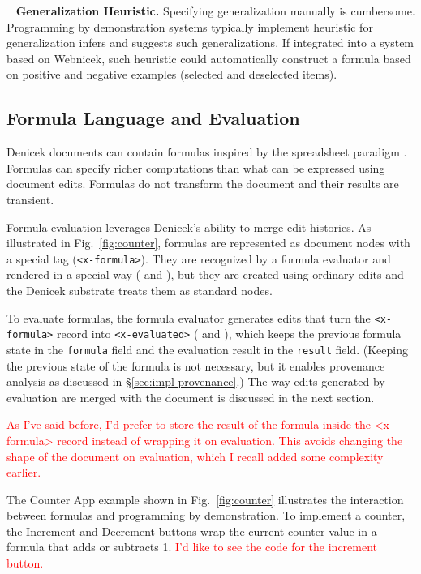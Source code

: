 \documentclass[sigconf,anonymous,screen]{acmart}
\newcommand{\note}[1]{\textcolor{red}{#1}}
\newcommand*\circled[1]{\textnormal{\footnotesize\sffamily\bfseries\protect\tikz[baseline=(char.base)]{
  \node[shape=circle,fill=black,text=white,draw,inner sep=1pt] (char) {#1};}}}
\DeclareRobustCommand{\keyideabox}[3]{\begin{tcolorbox}[breakable,
  boxsep=5pt,left=0pt,right=0pt,top=0pt,bottom=0pt,width=\dimexpr\columnwidth\relax,
  colback=gray!20,colframe=gray!20,
  enlarge bottom by=0pt,enlarge top by=0pt,
  arc=0pt,outer arc=0pt]
\lettrine[lraise=0.3]{\LARGE #1}{~}
\small \textbf{#2.} #3
\end{tcolorbox}
}
\begin{document}
\keyideabox{\faMagic}{Generalization Heuristic}{Specifying generalization manually is cumbersome.
Programming by demonstration systems typically implement heuristic for generalization
\cite{myers-2000-intelligence} infers and suggests such generalizations. If integrated into
a system based on Webnicek, such heuristic could automatically construct a formula
based on positive and negative examples \cite{gulwani-2014-flash} (selected and deselected items).}


\subsection{Formula Language and Evaluation}
\label{sec:impl-eval}

Denicek documents can contain formulas inspired by the spreadsheet
paradigm \cite{nardi-1990-spreadsheets}. Formulas can specify richer computations than
what can be expressed using document edits. Formulas do not transform the document and their
results are transient.

Formula evaluation leverages Denicek's ability to merge edit histories.
As illustrated in Fig.~\ref{fig:counter}, formulas are represented as document nodes with a
special tag ({\small\Verb_<x-formula>_}). They are recognized by a formula evaluator and
rendered in a special way (\circled{1} and \circled{4}), but they are created using ordinary
edits and the Denicek substrate treats them as standard nodes.

To evaluate formulas, the formula evaluator generates edits that turn the {\small\Verb_<x-formula>_}
record into {\small\Verb_<x-evaluated>_} (\circled{2} and \circled{3}), which keeps the previous
formula state in the {\small\Verb_formula_} field and the evaluation result in the {\small\Verb_result_} field.
(Keeping the previous state of the formula is not necessary, but it enables provenance analysis
as discussed in \S\ref{sec:impl-provenance}.) The way edits generated by evaluation are merged
with the document is discussed in the next section.

\note{As I've said before, I'd prefer to store the result of the formula inside the <x-formula> record instead of wrapping it on evaluation. This avoids changing the shape of the document on evaluation, which I recall added some complexity earlier.}

The Counter App example shown in Fig.~\ref{fig:counter} illustrates the interaction between formulas
and programming by demonstration. To implement a counter, the Increment and Decrement buttons
wrap the current counter value in a formula that adds or subtracts 1.
\note{I'd like to see the code for the increment button.}
\end{document}
